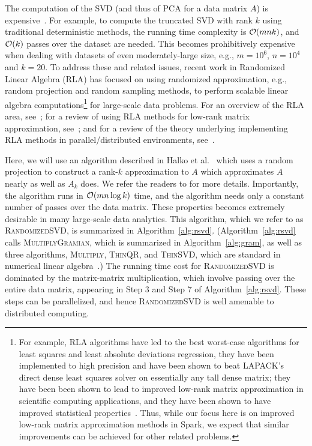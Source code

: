The computation of the SVD (and thus of PCA for a data matrix $A$) is
expensive~\cite{GVL96}.  For example, to compute the truncated SVD with rank
$k$ using traditional deterministic methods, the running time complexity is
$\operatorname{\mathcal{O}}(mnk)$, and $\operatorname{\mathcal{O}}(k)$ passes over the dataset are needed.  This  becomes
prohibitively expensive when dealing with datasets of even moderately-large
size, e.g., $m = 10^6$, $n = 10^4$ and $k = 20$.  To address these and related
issues, recent work in Randomized Linear Algebra (RLA) has focused on using
randomized approximation, e.g., random projection and random sampling methods,
to perform scalable linear algebra computations\footnote{For example, RLA
  algorithms have led to the best worst-case algorithms for least squares and
  least absolute deviations regression, they have been implemented to high
  precision and have been shown to beat LAPACK's direct dense least squares
  solver on essentially any tall dense matrix; they have been been shown to
  lead to improved low-rank matrix approximation in scientific computing
  applications, and they have been shown to have improved statistical
  properties~\cite{Mah-mat-rev_BOOK}.  Thus, while our focus here is on
  improved low-rank matrix approximation methods in Spark, we expect that
  similar improvements can be achieved for other related problems.} for
large-scale data problems.  For an overview of the RLA area,
see~\cite{Mah-mat-rev_BOOK}; for a review of using RLA methods for low-rank
matrix approximation, see~\cite{HMT09_SIREV}; and for a review of the theory
underlying implementing RLA methods in parallel/distributed environments,
see~\cite{YMM15_TR}.

Here, we will use an algorithm described in Halko et al.~\cite{HMT09_SIREV}
which uses a random projection to construct a rank-$k$ approximation to $A$
which approximates $A$ nearly as well as $A_k$ does.  We refer the readers to
\cite{HMT09_SIREV,Mah-mat-rev_BOOK} for more details.  Importantly, the
algorithm runs in $\operatorname{\mathcal{O}}(mn \log k)$ time, and the algorithm needs only a
constant number of passes over the data matrix.  These properties becomes
extremely desirable in many large-scale data analytics.  This algorithm, which
we refer to as \textsc{RandomizedSVD}, is summarized in
Algorithm~\ref{alg:rsvd}.  (Algorithm~\ref{alg:rsvd} calls
\textsc{MultiplyGramian}, which is summarized in Algorithm~\ref{alg:gram}, as
well as three algorithms, \textsc{Multiply}, \textsc{ThinQR}, and
\textsc{ThinSVD}, which are standard in numerical linear algebra~\cite{GVL96}.)
The running time cost for \textsc{RandomizedSVD} is dominated by the
matrix-matrix multiplication, which involve passing over the entire data
matrix, appearing in Step 3 and Step 7 of Algorithm~\ref{alg:rsvd}.  
These steps can be parallelized, and hence \textsc{RandomizedSVD} is well
amenable to distributed computing.


